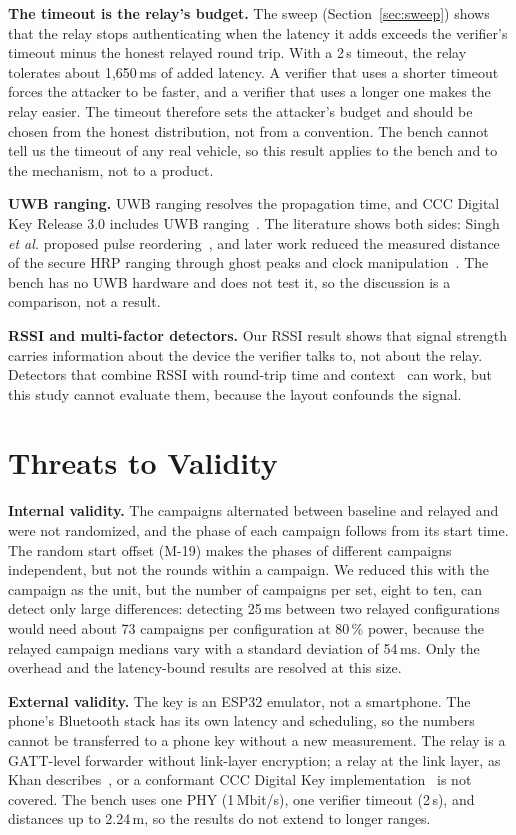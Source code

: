 \documentclass{ieeeaccess}
\begin{document}
\textbf{The timeout is the relay's budget.} The sweep (Section~\ref{sec:sweep}) shows that the relay stops authenticating when the latency it adds exceeds the verifier's timeout minus the honest relayed round trip. With a 2\,s timeout, the relay tolerates about 1,650\,ms of added latency. A verifier that uses a shorter timeout forces the attacker to be faster, and a verifier that uses a longer one makes the relay easier. The timeout therefore sets the attacker's budget and should be chosen from the honest distribution, not from a convention. The bench cannot tell us the timeout of any real vehicle, so this result applies to the bench and to the mechanism, not to a product.

\textbf{UWB ranging.} UWB ranging resolves the propagation time, and CCC Digital Key Release 3.0 includes UWB ranging~\cite{b9}. The literature shows both sides: Singh \emph{et al.} proposed pulse reordering~\cite{b5}, and later work reduced the measured distance of the secure HRP ranging through ghost peaks and clock manipulation~\cite{b6,b7,b8}. The bench has no UWB hardware and does not test it, so the discussion is a comparison, not a result.

\textbf{RSSI and multi-factor detectors.} Our RSSI result shows that signal strength carries information about the device the verifier talks to, not about the relay. Detectors that combine RSSI with round-trip time and context~\cite{b22,b23} can work, but this study cannot evaluate them, because the layout confounds the signal.

\section{Threats to Validity}
\label{sec:threats}

\textbf{Internal validity.} The campaigns alternated between baseline and relayed and were not randomized, and the phase of each campaign follows from its start time. The random start offset (M-19) makes the phases of different campaigns independent, but not the rounds within a campaign. We reduced this with the campaign as the unit, but the number of campaigns per set, eight to ten, can detect only large differences: detecting 25\,ms between two relayed configurations would need about 73 campaigns per configuration at 80\,\% power, because the relayed campaign medians vary with a standard deviation of 54\,ms. Only the overhead and the latency-bound results are resolved at this size.

\textbf{External validity.} The key is an ESP32 emulator, not a smartphone. The phone's Bluetooth stack has its own latency and scheduling, so the numbers cannot be transferred to a phone key without a new measurement. The relay is a GATT-level forwarder without link-layer encryption; a relay at the link layer, as Khan describes~\cite{b4}, or a conformant CCC Digital Key implementation~\cite{b9} is not covered. The bench uses one PHY (1\,Mbit/s), one verifier timeout (2\,s), and distances up to 2.24\,m, so the results do not extend to longer ranges.
\end{document}
